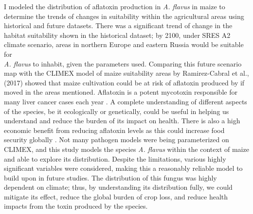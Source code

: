I modeled the distribution of aflatoxin production in \textit{A. flavus} in maize to determine the trends of changes in suitability within the agricultural areas using historical and future datasets. There was a significant trend of change in the habitat suitability shown in the historical dataset; by 2100, under SRES A2 climate scenario, areas in northern Europe and eastern Russia would be suitable for \\ \textit{A. flavus} to inhabit, given the parameters used. Comparing this future scenario map with the CLIMEX model of maize suitability areas by Ramirez-Cabral et al., (2017) showed that maize cultivation could be at risk of aflatoxin produced by  if moved in the areas mentioned. Aflatoxin is a potent mycotoxin responsible for many liver cancer cases each year \citep{liu2010global}. A complete understanding of different aspects of the species, be it ecologically or genetically, could be useful in helping us understand and reduce the burden of its impact on health. There is also a high economic benefit from reducing aflatoxin levels as this could increase food security globally \citep{gbashi2018socio}. Not many pathogen models were being parameterized on CLIMEX, and this study models the species \textit{A. flavus} within the context of maize and able to explore its distribution. Despite the limitations, various highly significant variables were considered, making this a reasonably reliable model to build upon in future studies. The distribution of this fungus was highly dependent on climate; thus, by understanding its distribution fully, we could mitigate its effect, reduce the global burden of crop loss, and reduce health impacts from the toxin produced by the species.
